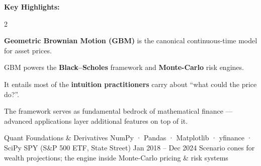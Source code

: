 \documentclass{pyportfolios-note}
\begin{document}
\thispagestyle{notecover}

%



\textbf{Key Highlights:}

\begin{multicols}{2}
\begin{notebullets}
\item \textbf{Geometric Brownian Motion (GBM)} is the canonical continuous-time
      model for asset prices.
\item GBM powers the \textbf{Black–Scholes} framework and \textbf{Monte-Carlo}
      risk engines.
\item It entails most of the \textbf{intuition practitioners} carry about
      ``what could the price do?''.
\item The framework serves as fundamental bedrock of mathematical finance —
      advanced applications layer additional features on top of it.
\end{notebullets}
\end{multicols}

\notecard
  {Quant Foundations \& Derivatives}
  {NumPy · Pandas · Matplotlib · yfinance · SciPy}
  {SPY (S\&P 500 ETF, State Street)}
  {Jan 2018 – Dec 2024}
  {Scenario cones for wealth projections; the engine inside Monte-Carlo pricing
   \& risk systems}

\newpage
\end{document}
